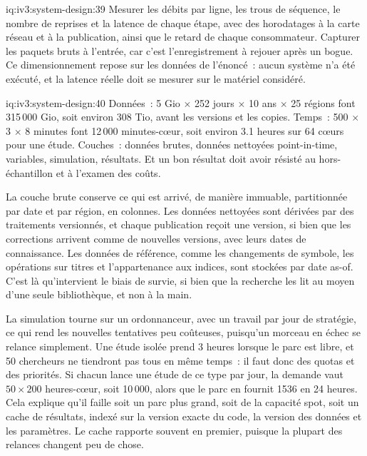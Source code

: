 \begin{solution}{iq:iv3:system-design:39}
Mesurer les débits par ligne, les trous de séquence, le nombre de reprises et la latence de chaque étape, avec des horodatages à la carte réseau et à la publication, ainsi que le retard de chaque consommateur. Capturer les paquets bruts à l'entrée, car c'est l'enregistrement à rejouer après un bogue. Ce dimensionnement repose sur les données de l'énoncé~: aucun système n'a été exécuté, et la latence réelle doit se mesurer sur le matériel considéré.

\end{solution}

\begin{solution}{iq:iv3:system-design:40}
Données~: 5 Gio $\times$ 252 jours $\times$ 10 ans $\times$ 25 régions font 315\,000 Gio, soit environ 308 Tio, avant les versions et les copies. Temps~: 500 $\times$ 3 $\times$ 8 minutes font 12\,000 minutes-cœur, soit environ 3.1 heures sur 64 cœurs pour une étude. Couches~: données brutes, données nettoyées point-in-time, variables, simulation, résultats. Et un bon résultat doit avoir résisté au hors-échantillon et à l'examen des coûts.

La couche brute conserve ce qui est arrivé, de manière immuable, partitionnée par date et par région, en colonnes. Les données nettoyées sont dérivées par des traitements versionnés, et chaque publication reçoit une version, si bien que les corrections arrivent comme de nouvelles versions, avec leurs dates de connaissance. Les données de référence, comme les changements de symbole, les opérations sur titres et l'appartenance aux indices, sont stockées par date as-of. C'est là qu'intervient le biais de survie, si bien que la recherche les lit au moyen d'une seule bibliothèque, et non à la main.

La simulation tourne sur un ordonnanceur, avec un travail par jour de stratégie, ce qui rend les nouvelles tentatives peu coûteuses, puisqu'un morceau en échec se relance simplement. Une étude isolée prend 3 heures lorsque le parc est libre, et 50 chercheurs ne tiendront pas tous en même temps~: il faut donc des quotas et des priorités. Si chacun lance une étude de ce type par jour, la demande vaut $50 \times 200$ heures-cœur, soit 10\,000, alors que le parc en fournit 1536 en 24 heures. Cela explique qu'il faille soit un parc plus grand, soit de la capacité spot, soit un cache de résultats, indexé sur la version exacte du code, la version des données et les paramètres. Le cache rapporte souvent en premier, puisque la plupart des relances changent peu de chose.


\end{solution}
